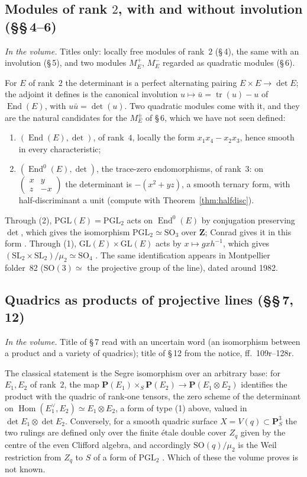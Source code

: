 \documentclass[11pt,a4paper]{amsart}
\newcommand{\End}{\operatorname{End}}
\newcommand{\GL}{\mathrm{GL}}
\newcommand{\PGL}{\mathrm{PGL}}
\newcommand{\SO}{\mathrm{SO}}
\newcommand{\Pj}{\mathbf{P}}
\newcommand{\Z}{\mathbf{Z}}
\newcommand{\tr}{\operatorname{tr}}
\newcommand{\status}[1]{\par\smallskip\noindent\textit{In the volume.} #1\par\smallskip}
\theoremstyle{plain}
\theoremstyle{definition}
\begin{document}
\subsection{Modules of rank $2$, with and without involution (\S\S\,4--6)}
\status{Titles only: locally free modules of rank~$2$ (\S\,4), the same with an involution (\S\,5), and two modules $M^+_E$, $M^-_E$ regarded as quadratic modules (\S\,6).}
For $E$ of rank~$2$ the determinant is a perfect alternating pairing $E\times E\to\det E$; the adjoint it defines is the canonical involution $u\mapsto\bar u=\tr(u)-u$ of $\End(E)$, with $u\bar u=\det(u)$. Two quadratic modules come with it, and they are the natural candidates for the $M_E^\pm$ of \S\,6, which we have not seen defined:
\begin{enumerate}
\item $(\End(E),\det)$, of rank~$4$, locally the form $x_1x_4-x_2x_3$, hence smooth in every characteristic;
\item $(\End^0(E),\det)$, the trace-zero endomorphisms, of rank~$3$: on $\left(\begin{smallmatrix}x&y\\ z&-x\end{smallmatrix}\right)$ the determinant is $-(x^2+yz)$, a smooth ternary form, with half-discriminant a unit (compute with Theorem~\ref{thm:halfdisc}).
\end{enumerate}
Through (2), $\PGL(E)=\PGL_2$ acts on $\End^0(E)$ by conjugation preserving $\det$, which gives the isomorphism $\PGL_2\simeq\SO_3$ over $\Z$; Conrad gives it in this form \cite[Ex.~C.6.2]{conrad}. Through (1), $\GL(E)\times\GL(E)$ acts by $x\mapsto gxh^{-1}$, which gives $(\mathrm{SL}_2\times\mathrm{SL}_2)/\mu_2\simeq\SO_4$ \cite[Ex.~C.6.3]{conrad}. The same identification appears in Montpellier folder~82 ($\SO(3)\simeq$ the projective group of the line), dated around 1982.

\subsection{Quadrics as products of projective lines (\S\S\,7, 12)}
\status{Title of \S\,7 read with an uncertain word (an isomorphism between a product and a variety of quadrics); title of \S\,12 from the notice, ff.~109r--128r.}
The classical statement is the Segre isomorphism over an arbitrary base: for $E_1,E_2$ of rank~$2$, the map $\Pj(E_1)\times_S\Pj(E_2)\to\Pj(E_1\otimes E_2)$ identifies the product with the quadric of rank-one tensors, the zero scheme of the determinant on $\operatorname{Hom}(E_1^\vee,E_2)\simeq E_1\otimes E_2$, a form of type (1) above, valued in $\det E_1\otimes\det E_2$. Conversely, for a smooth quadric surface $X=V(q)\subset\Pj^3_S$ the two rulings are defined only over the finite étale double cover $Z_q$ given by the centre of the even Clifford algebra, and accordingly $\SO(q)/\mu_2$ is the Weil restriction from $Z_q$ to $S$ of a form of $\PGL_2$ \cite[Ex.~C.6.3]{conrad}. Which of these the volume proves is not known.
\end{document}
